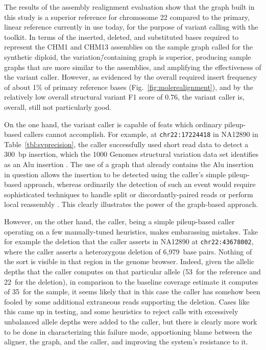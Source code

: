 The results of the assembly realignment evaluation show that the graph built in this study is a superior reference for chromosome 22 compared to the primary, linear reference currently in use today, for the purpose of variant calling with the \vg toolkit. In terms of the inserted, deleted, and substituted bases required to represent the CHM1 and CHM13 assemblies on the sample graph called for the synthetic diploid, the variation\=/containing graph is superior, producing sample graphs that are more similar to the assemblies, and amplifying the effectiveness of the variant caller. However, as evidenced by the overall required insert frequency of about 1\% of primary reference bases (Fig.~\ref{fig:molerealignment}), and by the relatively low overall structural variant F1 score of 0.76, the \vg variant caller is, overall, still not particularly good.

On the one hand, the \vg variant caller is capable of feats which ordinary pileup-based callers cannot accomplish. For example, at \texttt{chr22:17224418} in NA12890 in Table~\ref{tbl:svprecision}, the \vg caller successfully used short read data to detect a 300~bp insertion, which the 1000 Genomes structural variation data set identifies as an Alu insertion \cite{sudmant2015integrated}. The use of a graph that already contains the Alu insertion in question allows the insertion to be detected using the \vg caller's simple pileup-based approach, whereas ordinarily the detection of such an event would require sophisticated techniques to handle split or discordantly-paired reads or perform local reassembly \cite{wildschutte2015discovery}. This clearly illustrates the power of the graph-based approach.



However, on the other hand, the \vg caller, being a simple pileup-based caller operating on a few manually-tuned heuristics, makes embarassing mistakes. Take for example the deletion that the caller asserts in NA12890 at \texttt{chr22:43678002}, where the caller asserts a heterozygous deletion of 6,979~base pairs. Nothing of the sort is visible in that region in the genome browser. Indeed, given the allelic depths that the caller computes on that particular allele (53~for the reference and 22~for the deletion), in comparison to the baseline coverage estimate it computes of 35~for the sample, it seems likely that in this case the caller has somehow been fooled by some additional extraneous reads supporting the deletion. Cases like this came up in testing, and some heuristics to reject calls with excessively unbalanced allele depths were added to the caller, but there is clearly more work to be done in characterizing this failure mode, apportioning blame between the aligner, the graph, and the caller, and improving the system's resistance to it.

